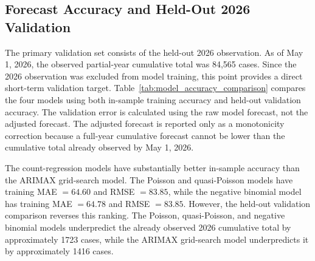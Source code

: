 \documentclass[utf8]{FrontiersinHarvard} %
\begin{document}
\subsection{Forecast Accuracy and Held-Out 2026 Validation}
The primary validation set consists of the held-out 2026 observation. As of May 1, 2026, the observed partial-year cumulative total was 84,565 cases. Since the 2026 observation was excluded from model training, this point provides a direct short-term validation target. Table~\ref{tab:model_accuracy_comparison} compares the four models using both in-sample training accuracy and held-out validation accuracy. The validation error is calculated using the raw model forecast, not the adjusted forecast. The adjusted forecast is reported only as a monotonicity correction because a full-year cumulative forecast cannot be lower than the cumulative total already observed by May 1, 2026.
\begin{table}[h!]
\centering
\caption{Training and held-out 2026 validation accuracy across the four models.}
\label{tab:model_accuracy_comparison}
\small
\setlength{\tabcolsep}{4pt}
\end{table}
The count-regression models have substantially better in-sample accuracy than the ARIMAX grid-search model. The Poisson and quasi-Poisson models have training MAE \(=64.60\) and RMSE \(=83.85\), while the negative binomial model has training MAE \(=64.78\) and RMSE \(=83.85\). However, the held-out validation comparison reverses this ranking. The Poisson, quasi-Poisson, and negative binomial models underpredict the already observed 2026 cumulative total by approximately 1723 cases, while the ARIMAX grid-search model underpredicts it by approximately 1416 cases.
\end{document}
